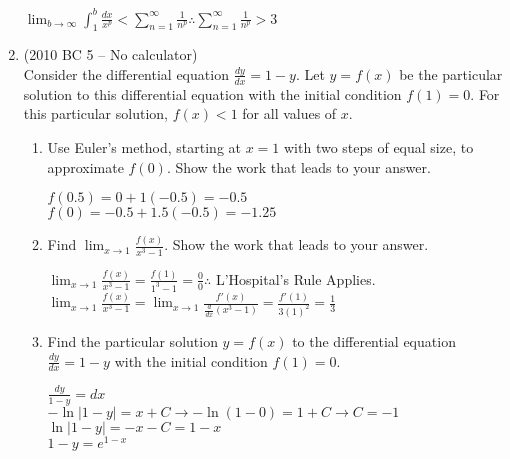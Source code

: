 \documentclass[10pt,letterpaper]{report}
\begin{document}
\begin{enumerate}
  $\lim_{b\to\infty}\int_{1}^{b}{\frac{dx}{x^{p}}} < \sum_{n=1}^{\infty}\frac{1}{n^{p}} \therefore \sum_{n=1}^{\infty}\frac{1}{n^{p}} > 3$ \\
  
  \pagebreak
  
  \item{(2010 BC 5 -- No calculator) \\
        Consider the differential equation $\frac{dy}{dx}=1-y$. Let $y=f(x)$ be the particular solution to this differential equation with the initial condition $f(1)=0$. For this particular solution, $f(x) < 1$ for all values of $x$. }
  \begin{enumerate}
    \item{Use Euler's method, starting at $x=1$ with two steps of equal size, to approximate $f(0)$. Show the work that leads to your answer. \\}
    
      $f(0.5) = 0 + 1(-0.5) = -0.5$ \\
      
      $f(0) = -0.5 + 1.5(-0.5) = -1.25$ \\
      
    \item{Find $\lim_{x\to 1}\frac{f(x)}{x^{3}-1}$. Show the work that leads to your answer. \\}
    
      $\lim_{x\to 1}\frac{f(x)}{x^{3}-1} = \frac{f(1)}{1^{3}-1} = \frac{0}{0} \therefore$ L'Hospital's Rule Applies. \\
      
      $\lim_{x\to 1}\frac{f(x)}{x^{3}-1} = \lim_{x\to 1}\frac{f'(x)}{\frac{d}{dx}(x^{3}-1)} = \frac{f'(1)}{3(1)^{2}} = \frac{1}{3}$ \\
      
    \item{Find the particular solution $y=f(x)$ to the differential equation $\frac{dy}{dx}=1-y$ with the initial condition $f(1)=0$. \\}
    
      $\frac{dy}{1-y} = dx$ \\
      
      $-\ln{|1-y|} = x + C \rightarrow -\ln{(1-0)} = 1 + C \rightarrow C = -1$ \\
      
      $\ln{|1-y|} = -x-C = 1-x$ \\
      
      $1-y = e^{1-x}$ \\
      

\end{enumerate}
\end{enumerate}
\end{document}
